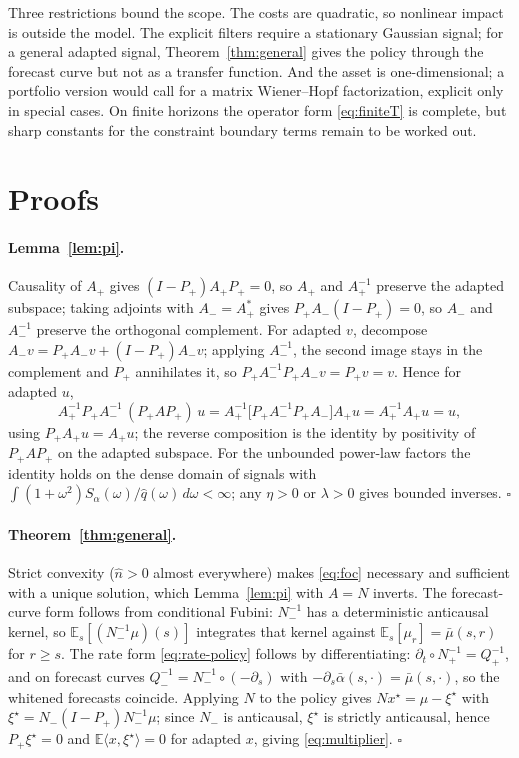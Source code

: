 \documentclass[11pt]{article}
\newcommand{\E}{\mathbb{E}}
\theoremstyle{plain}
\theoremstyle{definition}
\theoremstyle{remark}
\begin{document}
Three restrictions bound the scope. The costs are quadratic, so nonlinear impact is outside the model. The explicit filters require a stationary Gaussian signal; for a general adapted signal, Theorem~\ref{thm:general} gives the policy through the forecast curve but not as a transfer function. And the asset is one-dimensional; a portfolio version would call for a matrix Wiener--Hopf factorization, explicit only in special cases. On finite horizons the operator form \eqref{eq:finiteT} is complete, but sharp constants for the constraint boundary terms remain to be worked out.

\appendix
\section{Proofs}\label{app:proofs}

\paragraph{Lemma~\ref{lem:pi}.} Causality of $A_+$ gives $(I-P_+)A_+P_+=0$, so $A_+$ and $A_+^{-1}$ preserve the adapted subspace; taking adjoints with $A_-=A_+^\ast$ gives $P_+A_-(I-P_+)=0$, so $A_-$ and $A_-^{-1}$ preserve the orthogonal complement. For adapted $v$, decompose $A_-v=P_+A_-v+(I-P_+)A_-v$; applying $A_-^{-1}$, the second image stays in the complement and $P_+$ annihilates it, so $P_+A_-^{-1}P_+A_-v=P_+v=v$. Hence for adapted $u$,
\[
A_+^{-1}P_+A_-^{-1}\,(P_+AP_+)\,u = A_+^{-1}\bigl[P_+A_-^{-1}P_+A_-\bigr]A_+u = A_+^{-1}A_+u = u,
\]
using $P_+A_+u=A_+u$; the reverse composition is the identity by positivity of $P_+AP_+$ on the adapted subspace. For the unbounded power-law factors the identity holds on the dense domain of signals with $\int(1+\omega^2)S_\alpha(\omega)/\hat q(\omega)\,d\omega<\infty$; any $\eta>0$ or $\lambda>0$ gives bounded inverses. $\square$

\paragraph{Theorem~\ref{thm:general}.} Strict convexity ($\hat n>0$ almost everywhere) makes \eqref{eq:foc} necessary and sufficient with a unique solution, which Lemma~\ref{lem:pi} with $A=N$ inverts. The forecast-curve form follows from conditional Fubini: $N_-^{-1}$ has a deterministic anticausal kernel, so $\E_s[(N_-^{-1}\mu)(s)]$ integrates that kernel against $\E_s[\mu_r]=\bar\mu(s,r)$ for $r\ge s$. The rate form \eqref{eq:rate-policy} follows by differentiating: $\partial_t\circ N_+^{-1}=Q_+^{-1}$, and on forecast curves $Q_-^{-1}=N_-^{-1}\circ(-\partial_s)$ with $-\partial_s\bar\alpha(s,\cdot)=\bar\mu(s,\cdot)$, so the whitened forecasts coincide. Applying $N$ to the policy gives $Nx^\star=\mu-\xi^\star$ with $\xi^\star=N_-(I-P_+)N_-^{-1}\mu$; since $N_-$ is anticausal, $\xi^\star$ is strictly anticausal, hence $P_+\xi^\star=0$ and $\E\langle x,\xi^\star\rangle=0$ for adapted $x$, giving \eqref{eq:multiplier}. $\square$
\end{document}
